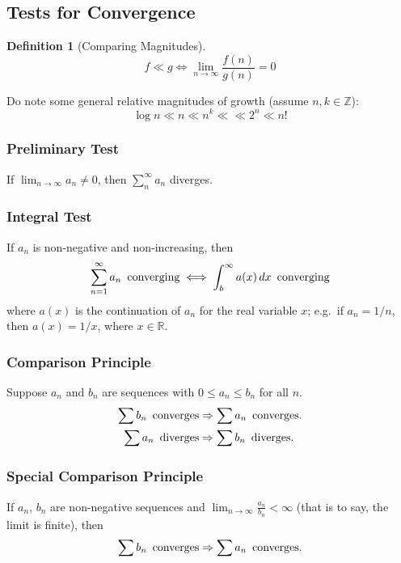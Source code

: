 \documentclass[10pt]{scrartcl}
\numberwithin{equation}{subsection}
\theoremstyle{definition}
\newtheorem{definition}{Definition}[section]
\theoremstyle{remark}
\newenvironment{definitionSR}
{
\begin{siderules}
\begin{definition}
}
{
\end{definition}
\end{siderules}
}
\newcommand{\Integers}{\mathbb{Z}}
\begin{document}
\subsection{Tests for Convergence}

\begin{definitionSR}[Comparing Magnitudes]
\[
 f \ll g \iff \lim_{n \to \infty } \frac{f(n)}{g(n)} = 0
\]
\end{definitionSR}

Do note some general relative magnitudes of growth (assume $n, k \in \Integers$):
\begin{equation}
\log n \ll n \ll n^k \ll \ll 2^n \ll n!
\end{equation}

\subsubsection{Preliminary Test}
If $\lim_{n \to \infty} a_n \neq 0$, then $\sum_n^\infty a_n$ diverges.

\subsubsection{Integral Test}
If $a_n$ is non-negative and non-increasing, then
\[
	\sum_{n=1}^\infty a_n \text{\, converging} \iff \int_b^\infty a(x)\,dx \text{\, converging}
\]
where $a(x)$ is the continuation of $a_n$ for the real variable $x$; e.g.\ if $a_n = 1/n$, then $a(x) = 1/x$, where $x \in \mathbb{R}$.
\subsubsection{Comparison Principle}
Suppose $a_n$ and $b_n$ are sequences with $0 \leq a_n \leq b_n$ for all $n$.
\begin{align*}
\sum b_n \text{\, converges}  &\Rightarrow \sum a_n \text{\, converges.} \\
\sum a_n \text{\, diverges}  &\Rightarrow \sum b_n \text{\, diverges.}
\end{align*}

\subsubsection{Special Comparison Principle}
If $a_n$, $b_n$ are non-negative sequences and $\lim_{n \to \infty} \frac{a_n}{b_n} < \infty$ (that is to say, the limit is finite), then
\[
\sum b_n \text{\, converges}  \Rightarrow \sum a_n \text{\, converges.} 
\]
\end{document}
